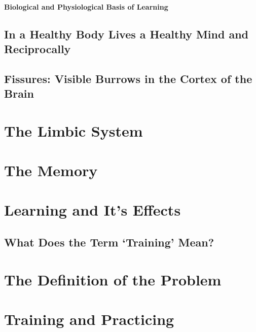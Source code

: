 \documentclass[../main.tex]{subfiles}
\begin{document}
\subsubsection{Biological and Physiological Basis of Learning}



\section[Healthy Mind and Body]{In a Healthy Body Lives a Healthy Mind and Reciprocally}



\section[Fissures]{Fissures: Visible Burrows in the Cortex of the Brain}



\chapter{The Limbic System}



\chapter{The Memory}


 
\chapter{Learning and It's Effects}

\section[Training]{What Does the Term `Training' Mean?}


  
\chapter[Problem]{The Definition of the Problem}\label{Le:problem}



\chapter{Training and Practicing}
\end{document}
